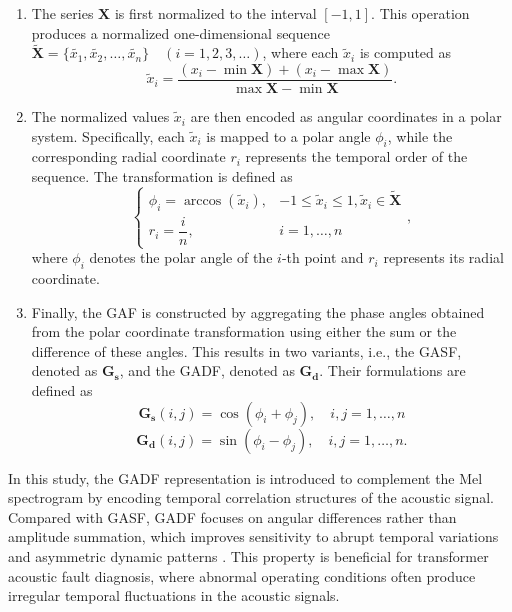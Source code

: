 \documentclass[journal]{IEEEtran}
\begin{document}
\begin{enumerate}
\item The series $\boldsymbol{X}$ is first normalized to the interval \([-1,1]\). This operation produces a normalized one-dimensional sequence $\boldsymbol{\tilde X} = \{\tilde{x_1}, \tilde{x_2}, \ldots, \tilde{x_n}\} \quad (i = 1, 2, 3,\ldots)$, where each $\tilde{x}_i$ is computed as
\begin{equation}
	\tilde{x}_i = \frac{(x_i - \min \boldsymbol{X}) + (x_i - \max \boldsymbol{X})}{\max \boldsymbol{X} - \min \boldsymbol{X}}.
	\label{normalization}
\end{equation}
\item The normalized values $\tilde{x}_i$ are then encoded as angular coordinates in a polar system. Specifically, each $\tilde{x}_i$ is mapped to a polar angle $\phi_i$, while the corresponding radial coordinate $r_i$ represents the temporal order of the sequence. The transformation is defined as
\begin{equation}
	\begin{cases} 
		\phi_i = \arccos(\tilde{x}_i), & -1 \leq \tilde{x}_i \leq 1,  \tilde{x}_i \in \boldsymbol{\tilde X} \\
		r_i = \dfrac{i}{n}, & i = 1, \ldots, n 
	\end{cases},
	\label{cosine angle}
\end{equation}
where $\phi_i$ denotes the polar angle of the $i$-th point and $r_i$ represents its radial coordinate.
\item Finally, the GAF is constructed by aggregating the phase angles obtained from the polar coordinate transformation using either the sum or the difference of these angles. This results in two variants, i.e., the GASF, denoted as $\boldsymbol{G_s}$, and the GADF, denoted as $\boldsymbol{G_d}$. Their formulations are defined as
\begin{equation}
	\boldsymbol{G_s}(i,j) = \cos(\phi_i + \phi_j), \quad i,j = 1,\ldots,n
	\label{eq:gasf}
\end{equation}
\begin{equation}
	\boldsymbol{G_d}(i,j) = \sin(\phi_i - \phi_j), \quad i,j = 1,\ldots,n.
	\label{eq:gadf}
\end{equation}
\end{enumerate}

In this study, the GADF representation is introduced to complement the Mel spectrogram by encoding temporal correlation structures of the acoustic signal. Compared with GASF, GADF focuses on angular differences rather than amplitude summation, which improves sensitivity to abrupt temporal variations and asymmetric dynamic patterns \cite{11278186}. This property is beneficial for transformer acoustic fault diagnosis, where abnormal operating conditions often produce irregular temporal fluctuations in the acoustic signals.
\end{document}
